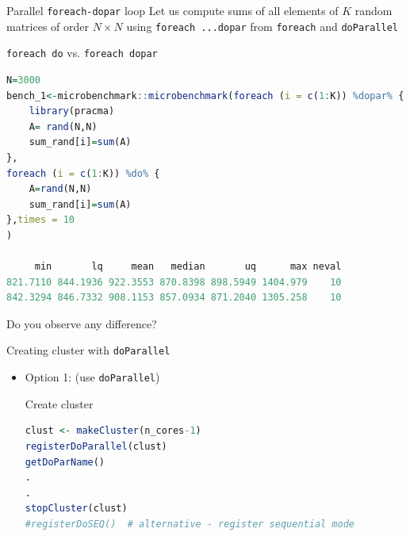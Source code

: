 \documentclass[compress,xcolor=table]{beamer}
\newcommand{\pp}{\pause}
\begin{document}
\begin{frame}[fragile]{ Parallel {\tt foreach-dopar} loop}
Let us compute sums of all elements of $K$ random matrices of order  $N\times N$ using {\tt foreach ...dopar} from {\tt foreach} and {\tt doParallel}
\begin{block}{{\tt foreach do} vs. {\tt foreach dopar}}\scriptsize
	\begin{lstlisting}[basicstyle=\color{blue}\tiny\ttfamily,language=R,escapeinside=`']
N=3000
bench_1<-microbenchmark::microbenchmark(foreach (i = c(1:K)) %dopar% {
	library(pracma)
	A= rand(N,N)
	sum_rand[i]=sum(A)
},
foreach (i = c(1:K)) %do% {
	A=rand(N,N)
	sum_rand[i]=sum(A)
},times = 10
)

     min       lq     mean   median       uq      max neval
821.7110 844.1936 922.3553 870.8398 898.5949 1404.979    10
842.3294 846.7332 908.1153 857.0934 871.2040 1305.258    10
	\end{lstlisting}
\pp
Do you observe any difference?
\end{block}

\end{frame}



\begin{frame}[fragile]{Creating cluster with {\tt doParallel}}
	\begin{itemize}
		\item Option 1: (use {\tt doParallel})
\begin{block}{Create cluster}\scriptsize
	\begin{lstlisting}[basicstyle=\color{blue}\tiny\ttfamily,language=R,escapeinside=`']
clust <- makeCluster(n_cores-1)  
registerDoParallel(clust)  
getDoParName()
.
.
stopCluster(clust)
#registerDoSEQ()  # alternative - register sequential mode
	\end{lstlisting}
\end{block}
\end{itemize}
\end{frame}
\end{document}
